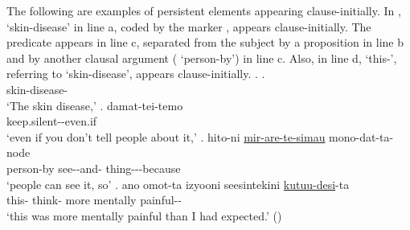 The following are examples of persistent elements appearing clause-initially.
In \Next,
 `skin-disease' in line a, coded by the  marker ,
appears clause-initially.
The predicate appears in line c,
separated from the subject by a proposition in line b and by another clausal argument ( `person-by') in line c.
Also, in line d,  `this-', referring to `skin-disease', appears clause-initially.
%
\ex.
 \ag.  \\
 		skin-disease- \\
		`The skin disease,'
 \bg. damat-tei-temo \\
 		keep.silent--even.if \\
		`even if you don't tell people about it,'
 \bg. hito-ni \ul{mir-are-te-simau} mono-dat-ta-node \\
 		person-by see--and- thing---because \\
		`people can see it, so'
 \bg.  ano omot-ta izyooni seesintekini \ul{kutuu-desi}-ta \\
 		this-  think- more mentally painful-- \\
		`this was more mentally painful than I had expected.'
		\hfill{()}


